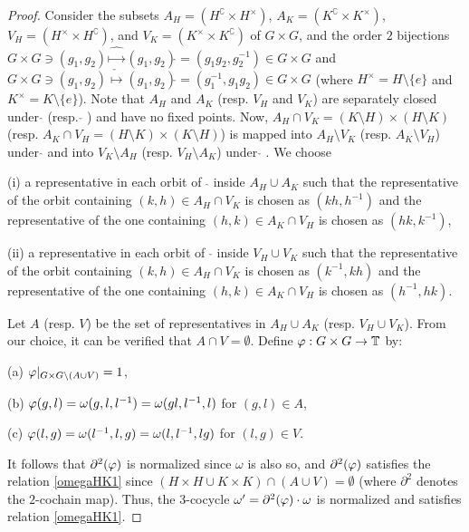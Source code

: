 \begin{proof}
Consider the subsets
$A_H = (H^\complement \times H^{\times})$,
$A_K = (K^\complement \times K^{\times})$,
$V_H = (H^{\times} \times H^\complement)$,
and
$V_K =(K^{\times} \times K^\complement)$ of
$G\times G$, and
the order $2$ bijections
$G\times G \ni (g_1,g_2) \hat{\mapsto}
(g_1,g_2)\hat{} = (g_1g_2,g^{-1}_2) \in G\times G$
and
$G\times G \ni (g_1,g_2) \check{\mapsto}
(g_1,g_2)\check{} = (g^{-1}_1,g_1g_2) \in
G\times G$
(where $H^\times = H \setminus \{e\}$ and
$K^\times = K \setminus \{e\}$). Note
that $A_H$ and $A_K$ (resp. $V_H$ and $V_K$)
are separately closed under $\hat{}$
(resp. $\check{}$ ) and have no fixed
points. Now,
$A_H \cap V_K = (K \setminus H) \times (H
\setminus K)$ (resp.
$A_K \cap V_H = (H \setminus K) \times (K
\setminus H)$) is mapped into
$A_H \setminus V_K$ (resp.
$A_K \setminus V_H$) under $\hat{}$ and into
$V_K \setminus A_H$ (resp.
$V_H \setminus A_K$) under $\check{}$ .
We choose

(i) a representative in each orbit of
$\; \hat{}$ inside ${A_H \cup A_K}$ such
that
the representative of the orbit containing
$(k,h) \in A_H \cap V_K$ is chosen as
$(kh,h^{-1})$ and the representative of the
one containing $(h,k) \in A_K \cap V_H$ is
chosen as $(hk,k^{-1})$,

(ii) a representative in each orbit of
$\; \check{}$ inside ${V_H \cup V_K}$ such
that
the representative of the orbit containing
$(k,h) \in A_H \cap V_K$ is chosen as
$(k^{-1},kh)$ and the representative of the
one containing $(h,k) \in A_K \cap V_H$ is
chosen as $(h^{-1},hk)$.

Let $A$ (resp. $V$) be the set of
representatives in $A_H \cup A_K$ (resp.
$V_H \cup V_K$). From our choice, it can be
verified that $A \cap V = \emptyset$. Define
$\varphi : G\times G \rightarrow \mathbb T$ by:

(a) $\varphi |_{G\times G \setminus (A \cup V)} = 1$,

(b)
$\varphi (g,l) = \omega (g,l,l^{-1}) = \omega
(gl, l^{-1},l)$ for $(g,l) \in A$,

(c)
$\varphi (l,g) = \omega (l^{-1},l,g) = \omega
(l, l^{-1},lg)$ for $(l,g) \in V$.

It follows that $\partial^2 ( \varphi ) $ is
normalized since $\omega$ is also so, and
$\partial^2 ( \varphi ) $ satisfies the
relation \ref{omegaHK1} since
$(H\times H \cup K \times K) \cap (A \cup V) = \emptyset$
(where $\partial^2$ denotes the $2$-cochain
map). Thus, the $3$-cocycle
$\omega^\prime = \partial^2 (\varphi) \cdot
\omega$ is normalized and satisfies relation \ref{omegaHK1}.


\end{proof}
